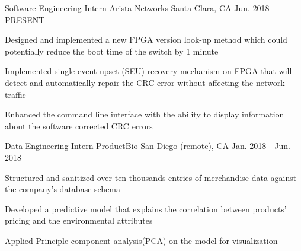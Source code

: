 

\begin{cventries}

  \cventry
    {Software Engineering Intern} %
    {Arista Networks} %
    {Santa Clara, CA} %
    {Jun. 2018 - PRESENT} %
    {
      \begin{cvitems} %
        \item {Designed and implemented a new FPGA version look-up method which could potentially reduce the boot time of the switch by 1 minute}
        \item {Implemented single event upset (SEU) recovery mechanism on FPGA that will detect and automatically repair the CRC error without affecting the network traffic}
% 
% 
        \item {Enhanced the command line interface with the ability to display information about the software corrected CRC errors}
      \end{cvitems}
    }

  \cventry
    {Data Engineering Intern} %
    {ProductBio} %
    {San Diego (remote), CA} %
    {Jan. 2018 - Jun. 2018} %
    {
      \begin{cvitems} %
        \item {Structured and sanitized over ten thousands entries of merchandise data against the company's database schema}
% 
% 
        \item {Developed a predictive model that explains the correlation between products' pricing and the environmental attributes}
        \item {Applied Principle component analysis(PCA) on the model for visualization}
% 
% 
      \end{cvitems}
    }
    

\end{cventries}
